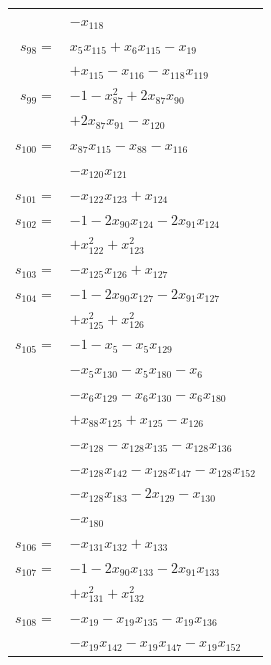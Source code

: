 \begin{longtable}{@{}r@{\;}l@{}}
 & \(\displaystyle -x_{118}\) \\[3pt]
\(s_{98}=\) & \(\displaystyle x_{5}x_{115} +x_{6}x_{115} -x_{19}\) \\
 & \(\displaystyle +x_{115} -x_{116} -x_{118}x_{119}\) \\[3pt]
\(s_{99}=\) & \(\displaystyle -1 -x_{87}^{2} +2x_{87}x_{90}\) \\
 & \(\displaystyle +2x_{87}x_{91} -x_{120}\) \\[3pt]
\(s_{100}=\) & \(\displaystyle x_{87}x_{115} -x_{88} -x_{116}\) \\
 & \(\displaystyle -x_{120}x_{121}\) \\[3pt]
\(s_{101}=\) & \(\displaystyle -x_{122}x_{123} +x_{124}\) \\[3pt]
\(s_{102}=\) & \(\displaystyle -1 -2x_{90}x_{124} -2x_{91}x_{124}\) \\
 & \(\displaystyle +x_{122}^{2} +x_{123}^{2}\) \\[3pt]
\(s_{103}=\) & \(\displaystyle -x_{125}x_{126} +x_{127}\) \\[3pt]
\(s_{104}=\) & \(\displaystyle -1 -2x_{90}x_{127} -2x_{91}x_{127}\) \\
 & \(\displaystyle +x_{125}^{2} +x_{126}^{2}\) \\[3pt]
\(s_{105}=\) & \(\displaystyle -1 -x_{5} -x_{5}x_{129}\) \\
 & \(\displaystyle -x_{5}x_{130} -x_{5}x_{180} -x_{6}\) \\
 & \(\displaystyle -x_{6}x_{129} -x_{6}x_{130} -x_{6}x_{180}\) \\
 & \(\displaystyle +x_{88}x_{125} +x_{125} -x_{126}\) \\
 & \(\displaystyle -x_{128} -x_{128}x_{135} -x_{128}x_{136}\) \\
 & \(\displaystyle -x_{128}x_{142} -x_{128}x_{147} -x_{128}x_{152}\) \\
 & \(\displaystyle -x_{128}x_{183} -2x_{129} -x_{130}\) \\
 & \(\displaystyle -x_{180}\) \\[3pt]
\(s_{106}=\) & \(\displaystyle -x_{131}x_{132} +x_{133}\) \\[3pt]
\(s_{107}=\) & \(\displaystyle -1 -2x_{90}x_{133} -2x_{91}x_{133}\) \\
 & \(\displaystyle +x_{131}^{2} +x_{132}^{2}\) \\[3pt]
\(s_{108}=\) & \(\displaystyle -x_{19} -x_{19}x_{135} -x_{19}x_{136}\) \\
 & \(\displaystyle -x_{19}x_{142} -x_{19}x_{147} -x_{19}x_{152}\) \\

\end{longtable}
